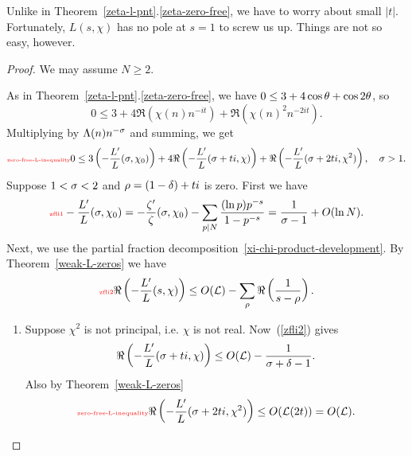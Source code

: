 Unlike in Theorem~\ref{zeta-l-pnt}.\ref{zeta-zero-free}, we have to worry about small $|t|$. Fortunately, $L(s,\chi)$ has no pole at $s=1$ to screw us up. Things are not so easy, however.
\begin{proof}
We may assume $N\ge 2$.

As in Theorem~\ref{zeta-l-pnt}.\ref{zeta-zero-free}, we have $0\le 3+4\cos \theta+\cos 2\theta$, so
\[
0\le 3+4\Re(\chi(n)n^{-it})+\Re(\chi(n)^2n^{-2it}).
\]
Multiplying by $\Lambda(n)n^{-\sigma}$ and summing, we get
\begin{equation}\llabel{zero-free-L-inequality}
0\le 3\pa{-\frac{L'}{L}(\si,\chi_0)} 
+4\Re\pa{-\frac{L'}{L}(\si+ti,\chi)}
+\Re\pa{-\frac{L'}{L}(\si+2ti,\chi^2)},\quad\si>1.
\end{equation}
Suppose $1<\sigma<2$ and $\rho=(1-\delta)+ti$ is zero.
First we have
\begin{equation}\llabel{zfli1}
-\fc{L'}{L}(\si,\chi_0) =-\fc{\ze'}{\ze}(\si,\chi_0) - \sum_{p\mid N}\fc{(\ln p)p^{-s}}{1-p^{-s}}=\rc{\si-1} +O(\ln N).
\end{equation}
Next, we use the partial fraction decomposition~\ref{xi-chi-product-development}.
By  %
Theorem~\ref{weak-L-zeros} we have
\begin{equation}\llabel{zfli2}
\Re\pa{-\frac{L'}{L}(s,\chi)} %
\le O(\cal L)-\sum_{\rh}\Re\prc{s-\rh}.
\end{equation}
\begin{enumerate}
\item
Suppose $\chi^2$ is not principal, i.e. $\chi$ is not real. %
Now~(\ref{zfli2}) gives
\begin{equation}
\Re\left( {-\frac{L'}{L}(\sigma+ti,\chi)} \right)\le O(\mathcal{L})-\frac{1}{\sigma+\delta-1}.
\end{equation}
Also by Theorem~\ref{weak-L-zeros}
\begin{equation}\llabel{zero-free-L-inequality}
\Re\pa{-\frac{L'}{L}(\si+2ti,\chi^2)}\le O(\cal L(2t))=O(\cal L).
\end{equation}

\end{enumerate}
\end{proof}
